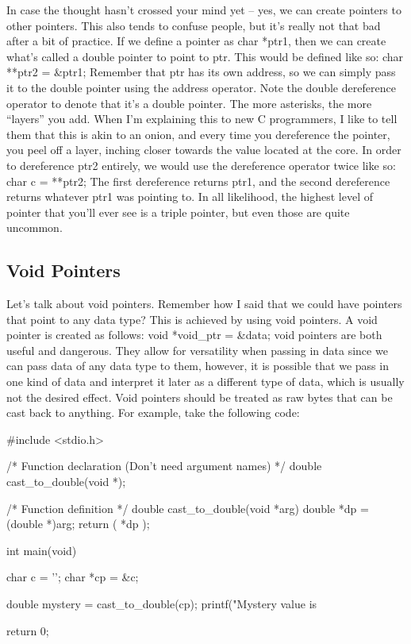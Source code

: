 \documentclass{article}
\begin{document}
In case the thought hasn’t crossed your mind yet – yes, we can create pointers to other pointers. This also
tends to confuse people, but it’s really not that bad after a bit of practice. If we define a pointer as
char *ptr1, then we can create what’s called a double pointer to point to ptr. This would be defined like so:
char **ptr2 = &ptr1; Remember that ptr has its own address, so we can simply pass it to the double pointer
using the address operator. Note the double dereference operator to denote that it’s a double pointer. The
more asterisks, the more “layers” you add. When I’m explaining this to new C programmers, I like to tell them
that this is akin to an onion, and every time you dereference the pointer, you peel off a layer, inching
closer towards the value located at the core. In order to dereference ptr2 entirely, we would use the
dereference operator twice like so: char c = **ptr2; The first dereference returns ptr1, and the second
dereference returns whatever ptr1 was pointing to. In all likelihood, the highest level of pointer that
you’ll ever see is a triple pointer, but even those are quite uncommon.

\subsection{Void Pointers}

Let’s talk about void pointers. Remember how I said that we could have pointers that point to any data type?
This is achieved by using void pointers. A void pointer is created as follows: void *void_ptr = &data; void
pointers are both useful and dangerous. They allow for versatility when passing in data since we can pass
data of any data type to them, however, it is possible that we pass in one kind of data and interpret it
later as a different type of data, which is usually not the desired effect. Void pointers should be treated
as raw bytes that can be cast back to anything. For example, take the following code:

\begin{cblk}
#include <stdio.h>

/* Function declaration (Don't need argument names) */
double cast_to_double(void *);

/* Function definition */
double cast_to_double(void *arg) {
   double *dp = (double *)arg;
   return ( *dp );
}

int main(void) {

   char c = '\0';
   char *cp = &c;

   double mystery = cast_to_double(cp);
   printf("Mystery value is %

   return 0;
}
\end{cblk}
\end{document}
